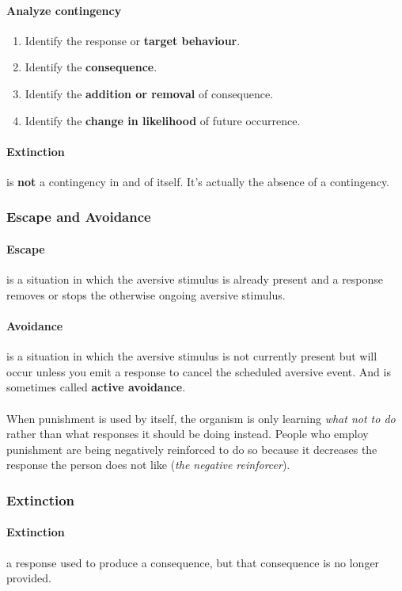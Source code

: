 \documentclass{article}
\begin{document}
	\paragraph{Analyze contingency}
	\begin{enumerate}
		\item Identify the response or \textbf{target behaviour}.
		\item Identify the \textbf{consequence}.
		\item Identify the \textbf{addition or removal} of consequence.
		\item Identify the \textbf{change in likelihood} of future occurrence.
	\end{enumerate}
	\paragraph{Extinction} is \textbf{not} a contingency in and of itself. It's actually the absence of a contingency.
	\subsubsection{Escape and Avoidance}
	\paragraph{Escape} is a situation in which the aversive stimulus is already present and a response removes or stops the otherwise ongoing aversive stimulus.
	\paragraph{Avoidance} is a situation in which the aversive stimulus is not currently present but will occur unless you emit a response to cancel the scheduled aversive event. And is sometimes called \textbf{active avoidance}.
	\paragraph{} When punishment is used by itself, the organism is only learning \emph{what not to do} rather than what responses it should be doing instead. People who employ punishment are being negatively reinforced to do so because it decreases the response the person does not like (\emph{the negative reinforcer}).
	\subsubsection{Extinction} 
	\paragraph{Extinction} a response used to produce a consequence, but that consequence is no longer provided.
	
\end{document}
